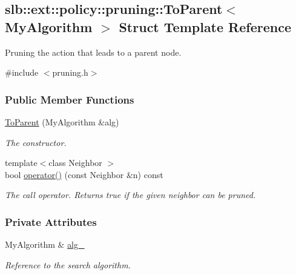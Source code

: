 \hypertarget{structslb_1_1ext_1_1policy_1_1pruning_1_1ToParent}{}\subsection{slb\+:\+:ext\+:\+:policy\+:\+:pruning\+:\+:To\+Parent$<$ My\+Algorithm $>$ Struct Template Reference}
\label{structslb_1_1ext_1_1policy_1_1pruning_1_1ToParent}


Pruning the action that leads to a parent node.  




{\ttfamily \#include $<$pruning.\+h$>$}

\subsubsection*{Public Member Functions}
\begin{DoxyCompactItemize}
\item 
\hyperlink{structslb_1_1ext_1_1policy_1_1pruning_1_1ToParent_a6b6ae8fb154896ad1d5301347277832b}{To\+Parent} (My\+Algorithm \&alg)
\begin{DoxyCompactList}\small\item\em The constructor. \end{DoxyCompactList}\item 
{\footnotesize template$<$class Neighbor $>$ }\\bool \hyperlink{structslb_1_1ext_1_1policy_1_1pruning_1_1ToParent_a732ab0e9bc239ad1ca73594f51272961}{operator()} (const Neighbor \&n) const 
\begin{DoxyCompactList}\small\item\em The call operator. Returns {\ttfamily true} if the given neighbor can be pruned. \end{DoxyCompactList}\end{DoxyCompactItemize}
\subsubsection*{Private Attributes}
\begin{DoxyCompactItemize}
\item 
My\+Algorithm \& \hyperlink{structslb_1_1ext_1_1policy_1_1pruning_1_1ToParent_a640f3ca8eec5e2dddba3fe023a93c98a}{alg\+\_\+}\hypertarget{structslb_1_1ext_1_1policy_1_1pruning_1_1ToParent_a640f3ca8eec5e2dddba3fe023a93c98a}{}\label{structslb_1_1ext_1_1policy_1_1pruning_1_1ToParent_a640f3ca8eec5e2dddba3fe023a93c98a}

\begin{DoxyCompactList}\small\item\em Reference to the search algorithm. \end{DoxyCompactList}\end{DoxyCompactItemize}


